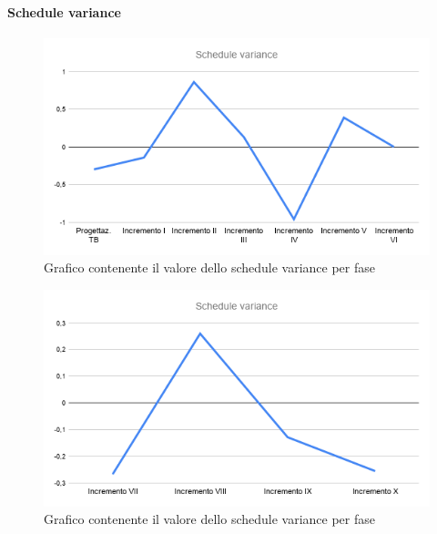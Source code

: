 	\paragraph{Schedule variance}
		\begin{figure}[H]
			\centering
			\includegraphics[width=0.8\linewidth]{./res/images/SV_1.png}
			\caption{Grafico contenente il valore dello schedule variance per fase}
			\label{fig:Grafico contenente il valore dello schedule variance per fase}
		\end{figure}
		\begin{figure}[H]
			\centering
			\includegraphics[width=0.8\linewidth]{./res/images/SV_2.png}
			\caption{Grafico contenente il valore dello schedule variance per fase}
			\label{fig:Grafico contenente il valore dello schedule variance per fase}
		\end{figure}


